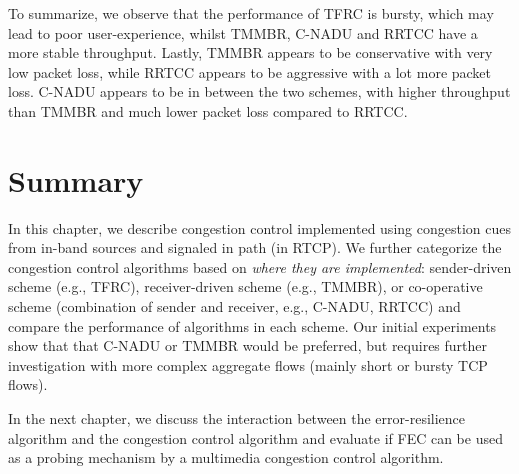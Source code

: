 To summarize, we observe that the performance of TFRC is bursty, which may
lead to poor user-experience, whilst TMMBR, C-NADU and RRTCC have a more
stable throughput. Lastly, TMMBR appears to be conservative with very low
packet loss, while RRTCC appears to be aggressive with a lot more packet loss.
C-NADU appears to be in between the two schemes, with higher throughput than
TMMBR and much lower packet loss compared to RRTCC. 

\section{Summary}

In this chapter, we describe congestion control implemented using congestion
cues from in-band sources and signaled in path (in RTCP). We further
categorize the congestion control algorithms based on \emph{where they are
implemented}: sender-driven scheme (e.g., TFRC), receiver-driven scheme (e.g.,
TMMBR), or co-operative scheme (combination of sender and receiver, e.g.,
C-NADU, RRTCC) and compare the performance of algorithms in each scheme. Our
initial experiments show that that C-NADU or TMMBR would be preferred, but
requires further investigation with more complex aggregate flows (mainly short
or bursty TCP flows).

In the next chapter, we discuss the interaction between the error-resilience
algorithm and the congestion control algorithm and evaluate if FEC can be used
as a probing mechanism by a multimedia congestion control algorithm.
